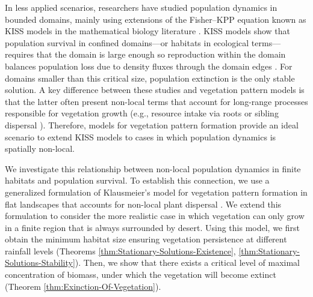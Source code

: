 \documentclass[11pt, a4paper]{article}
\theoremstyle{break}
\theoremstyle{break}
\theoremstyle{break}
\theoremstyle{break}
\theoremstyle{break}
\theoremstyle{break}
\theoremstyle{break}
\begin{document}
In less applied scenarios, researchers have studied population dynamics in bounded domains, mainly using extensions of the Fisher–KPP equation \cite{Cantrell1999,Fagan2009,Colombo2018,Dornelas2024} known as KISS models in the mathematical biology literature \cite{Skellam1951, Kierstead1953}. KISS models show that population survival in confined domains---or habitats in ecological terms--- requires that the domain is large enough so reproduction within the domain balances population loss due to density fluxes through the domain edges \cite{Cantrell2004}. For domains smaller than this critical size, population extinction is the only stable solution. A key difference between these studies and vegetation pattern models is that the latter often present non-local terms that account for long-range processes responsible for vegetation growth (e.g., resource intake via roots or sibling dispersal \cite{Martinez-Garcia2014,Eigentler2018}). Therefore, models for vegetation pattern formation provide an ideal scenario to extend KISS models to cases in which population dynamics is spatially non-local. 

We investigate this relationship between non-local population dynamics in finite habitats and population survival. To establish this connection, we use a generalized formulation of Klausmeier's model for vegetation pattern formation in flat landscapes that accounts for non-local plant dispersal \cite{Eigentler2018,Klausmeier1999}. We extend this formulation to consider the more realistic case in which vegetation can only grow in a finite region that is always surrounded by desert. Using this model, we first obtain the minimum habitat size ensuring vegetation persistence at different rainfall levels (Theorems \ref{thm:Stationary-Solutions-Existence}, \ref{thm:Stationary-Solutions-Stability}). Then, we show that there exists a critical level of maximal concentration of biomass, under which the vegetation will become extinct (Theorem \ref{thm:Exinction-Of-Vegetation}).
\end{document}
